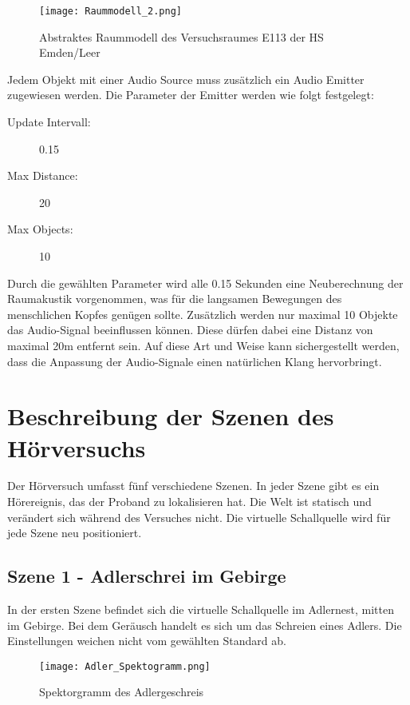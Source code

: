   \begin{figure}[H]
\centering
\texttt{[image: Raummodell\_2.png]}
\caption{Abstraktes Raummodell des Versuchsraumes E113 der HS Emden/Leer}
\label{fig:Raummodell}
\end{figure} 

Jedem Objekt mit einer Audio Source muss zusätzlich ein Audio Emitter zugewiesen werden. Die Parameter der Emitter werden wie folgt festgelegt: 

\begin{description}
\item[Update Intervall:] 0.15 
\item[Max Distance:] 20
\item[Max Objects:] 10
\end{description}

Durch die gewählten Parameter wird alle 0.15 Sekunden eine Neuberechnung der Raumakustik vorgenommen, was für die langsamen Bewegungen des menschlichen Kopfes genügen sollte.  Zusätzlich werden nur maximal 10 Objekte das Audio-Signal beeinflussen können. Diese dürfen dabei eine Distanz von maximal 20m entfernt sein.  Auf diese Art und Weise kann sichergestellt werden, dass die Anpassung der Audio-Signale einen natürlichen Klang hervorbringt. 

  \section{Beschreibung der Szenen des Hörversuchs}
  Der Hörversuch umfasst fünf verschiedene Szenen. In jeder Szene gibt es ein Hörereignis, das der Proband zu lokalisieren hat. Die Welt ist statisch und verändert sich während des Versuches nicht. Die virtuelle Schallquelle wird für jede Szene neu positioniert. 

  \subsection{Szene 1 - Adlerschrei im Gebirge}
  In der ersten Szene befindet sich die virtuelle Schallquelle im Adlernest, mitten im Gebirge. Bei dem Geräusch handelt es sich um das Schreien eines Adlers. Die Einstellungen weichen nicht vom gewählten Standard ab. 
  
    \begin{figure}[H]
\centering
\texttt{[image: Adler\_Spektogramm.png]}
\caption{Spektorgramm des Adlergeschreis}
\label{fig:Adler_Spektogramm}
\end{figure} 

